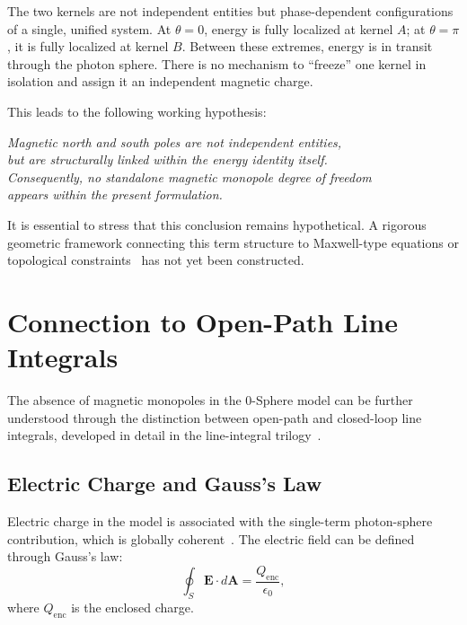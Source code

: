 \documentclass[12pt,letterpaper]{article}
\begin{document}
The two kernels are not independent entities but phase-dependent configurations of a single, unified system. At $\theta = 0$, energy is fully localized at kernel $A$; at $\theta = \pi$, it is fully localized at kernel $B$. Between these extremes, energy is in transit through the photon sphere. There is no mechanism to ``freeze'' one kernel in isolation and assign it an independent magnetic charge.

This leads to the following working hypothesis:

\begin{center}
\textit{Magnetic north and south poles are not independent entities,\\
but are structurally linked within the energy identity itself.\\
Consequently, no standalone magnetic monopole degree of freedom\\
appears within the present formulation.}
\end{center}

It is essential to stress that this conclusion remains hypothetical. A rigorous geometric framework connecting this term structure to Maxwell-type equations or topological constraints~\cite{Nakahara2003} has not yet been constructed.

\section{Connection to Open-Path Line Integrals}

The absence of magnetic monopoles in the 0-Sphere model can be further understood through the distinction between open-path and closed-loop line integrals, developed in detail in the line-integral trilogy~\cite{hanamura18067760,hanamura18135855,hanamura18203433}.

\subsection{Electric Charge and Gauss's Law}

Electric charge in the model is associated with the single-term photon-sphere contribution, which is globally coherent~\cite{hanamura18603340}. The electric field can be defined through Gauss's law:
\begin{equation}
\oint_S \mathbf{E} \cdot d\mathbf{A} = \frac{Q_{\mathrm{enc}}}{\epsilon_0},
\end{equation}
where $Q_{\mathrm{enc}}$ is the enclosed charge.
\end{document}
